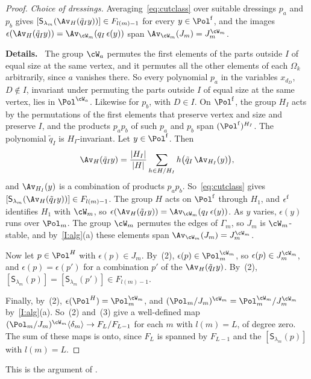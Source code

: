 \documentclass[11pt]{amsart}
\newenvironment{details}{\par\color{black!60!green}\noindent\textbf{Details.}\ }{\par}
\begin{document}
\begin{proof}
\emph{Choice of dressings.}  Averaging~\eqref{eq:cutclass} over suitable
dressings $p_a$ and $p_b$ gives $[\mathsf S_{\lambda_m}(\Av_H(\tilde
q_Iy))]\in F_{l(m)-1}$ for every $y\in\Pol^{\rm f}$, and the images
$\epsilon(\Av_H(\tilde q_Iy))=\Av_{\cW_m}(q_I\,\epsilon(y))$ span
$\Av_{\cW_m}(J_m)=J_m^{\cW_m}$.
\begin{details}
The group $\cW_a$ permutes the first elements
of the parts outside $I$ of equal size at the same vertex, and it permutes
all the other elements of each $\Omega_k$ arbitrarily, since $a$ vanishes
there.  So every polynomial $p_a$ in the variables $x_{d_D}$, $D\notin I$,
invariant under permuting the parts outside $I$ of equal size at the same
vertex, lies in $\Pol^{\cW_a}$.  Likewise for $p_b$, with $D\in I$.  On
$\Pol^{\rm f}$, the group $H_I$ acts by the permutations of the first elements
that preserve vertex and size and preserve $I$, and the products $p_ap_b$ of
such $p_a$ and $p_b$ span $(\Pol^{\rm f})^{H_I}$.  The polynomial $\tilde
q_I$ is $H_I$-invariant.  Let $y\in\Pol^{\rm f}$.  Then
\[
 \Av_H(\tilde q_Iy)=\frac{|H_I|}{|H|}\sum_{h\in H/H_I}h\big(\tilde
 q_I\,\Av_{H_I}(y)\big),
\]
and $\Av_{H_I}(y)$ is a combination of products $p_ap_b$.
So~\eqref{eq:cutclass} gives $[\mathsf S_{\lambda_m}(\Av_H(\tilde
q_Iy))]\in F_{l(m)-1}$.  The group $H$ acts on $\Pol^{\rm f}$ through $H_1$,
and $\epsilon^{\rm f}$ identifies $H_1$ with $\cW_m$, so
$\epsilon(\Av_H(\tilde q_Iy))=\Av_{\cW_m}(q_I\,\epsilon(y))$.  As $y$ varies,
$\epsilon(y)$ runs over $\Pol_m$.  The group $\cW_m$ permutes the edges of
$\Gamma_m$, so $J_m$ is $\cW_m$-stable, and by~\ref{I:alg}(a) these elements
span $\Av_{\cW_m}(J_m)=J_m^{\cW_m}$.
\end{details}

Now let $p\in\Pol^H$ with $\epsilon(p)\in J_m$.  By~(2), $\epsilon(p)\in
\Pol_m^{\cW_m}$, so $\epsilon(p)\in J_m^{\cW_m}$, and $\epsilon(p)=\epsilon(p')$
for a combination $p'$ of the $\Av_H(\tilde q_Iy)$.  By~(2), $[\mathsf
S_{\lambda_m}(p)]=[\mathsf S_{\lambda_m}(p')]\in F_{l(m)-1}$.

Finally, by~(2), $\epsilon(\Pol^H)=\Pol_m^{\cW_m}$, and
$(\Pol_m/J_m)^{\cW_m}=\Pol_m^{\cW_m}/J_m^{\cW_m}$ by~\ref{I:alg}(a).
So~(2) and~(3) give a well-defined map
$(\Pol_m/J_m)^{\cW_m}\langle\delta_m\rangle\to F_L/F_{L-1}$ for each $m$ with $l(m)=L$,
of degree zero.  The sum of these maps is onto, since $F_L$ is spanned by
$F_{L-1}$ and the $[\mathsf S_{\lambda_m}(p)]$ with $l(m)=L$.
\end{proof}

This is the argument of .
\end{document}

